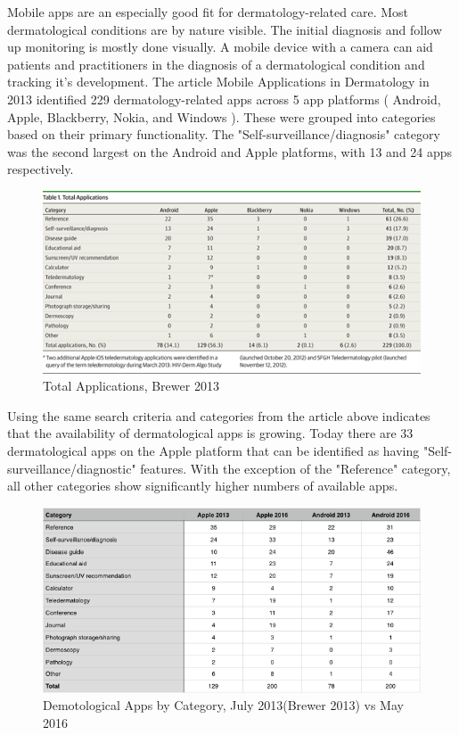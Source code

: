 Mobile apps are an especially good fit for dermatology-related care. Most dermatological conditions are by nature visible. The initial diagnosis and follow up monitoring is mostly done visually. A mobile device with a camera can aid patients and practitioners in the diagnosis of a dermatological condition and tracking it's development. The article Mobile Applications in Dermatology\cite{Brewer_2013} in 2013 identified 229 dermatology-related apps across 5 app platforms ( Android, Apple, Blackberry, Nokia, and Windows ). These were grouped into categories based on their primary functionality. The "Self-surveillance/diagnosis" category was the second largest on the Android and Apple platforms, with 13 and 24 apps respectively.

\begin{figure}[H]
    \centering
    \includegraphics[width=\textwidth]{assets/market_research/brewer.png}
    \caption{Total Applications, Brewer 2013}
    \label{fig:brewer}
\end{figure}

Using the same search criteria and categories from the article above indicates that the availability of dermatological apps is growing. Today there are 33 dermatological apps on the Apple platform that can be identified as having "Self-surveillance/diagnostic" features. With the exception of the "Reference" category, all other categories show significantly higher numbers of available apps.


\begin{figure}[H]
    \centering
    \includegraphics[width=\textwidth]{assets/market_research/apple2013vs2016.png}
    \caption{Demotological Apps by Category, July 2013(Brewer 2013) vs May 2016}
    \label{fig:apps_vs}
\end{figure}

